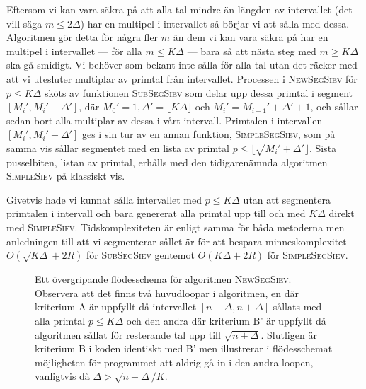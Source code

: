 Eftersom vi kan vara säkra på att alla tal mindre än längden av intervallet (det vill säga \(m \leq 2 \Delta\)) har en multipel i intervallet så börjar vi att sålla med dessa. Algoritmen gör detta för några fler \(m\) än dem vi kan vara säkra på har en multipel i intervallet --- för alla \(m \leq K \Delta\) --- bara så att nästa steg med \(m \geq K \Delta\) ska gå smidigt. Vi behöver som bekant inte sålla för alla tal utan det räcker med att vi utesluter multiplar av primtal från intervallet. Processen i \textsc{NewSegSiev} för \(p \leq K \Delta\) sköts av funktionen \textsc{SubSegSiev} som delar upp dessa primtal i segment \([M_i', M_i' + \Delta']\), där \(M_0' = 1, \Delta' = \lfloor K \Delta \rfloor\) och \(M_i' = M_{i-1}' + \Delta' + 1\), och sållar sedan bort alla multiplar av dessa i vårt intervall. Primtalen i intervallen \([M_i', M_i' + \Delta']\) ges i sin tur av en annan funktion, \textsc{SimpleSegSiev}, som på samma vis sållar segmentet med en lista av primtal \(p \leq \lfloor\sqrt{M_i' + \Delta'}\rfloor\). Sista pusselbiten, listan av primtal, erhålls med den tidigarenämnda algoritmen \textsc{SimpleSiev} på klassiskt vis. 

Givetvis hade vi kunnat sålla intervallet med \(p \leq K \Delta\) utan att segmentera primtalen i intervall och bara genererat alla primtal upp till och med \(K \Delta\) direkt med \textsc{SimpleSiev}. Tidskomplexiteten är enligt \cite{HaraldSieve} samma för båda metoderna men anledningen till att vi segmenterar sållet är för att bespara minneskomplexitet --- \(O(\sqrt{K \Delta} + 2R)\) för \textsc{SubSegSiev} gentemot \(O(K \Delta + 2R)\) för \textsc{SimpleSegSiev}. 


\begin{figure}
    \centering
    
    \caption{Ett övergripande flödesschema för algoritmen \textsc{NewSegSiev}. Observera att det finns två huvudloopar i algoritmen, en där kriterium A är uppfyllt då intervallet \([n - \Delta, n + \Delta]\) sållats med alla primtal \(p \leq K \Delta\) och den andra där kriterium B' är uppfyllt då algoritmen sållat för resterande tal upp till \(\sqrt{n + \Delta}\). Slutligen är kriterium B i koden identiskt med B' men illustrerar i flödesschemat möjligheten för programmet att aldrig gå in i den andra loopen, vanligtvis då \(\Delta > \sqrt{n + \Delta}/K\).}
    \label{fig:flowchart}
\end{figure}


